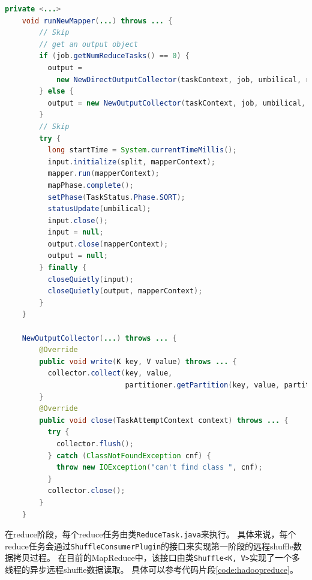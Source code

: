 \begin{lstlisting}[language={Java}, caption={Hadoop MapReduce中Map阶段的shuffle写代码片段}, label={code:hadoopmap}]
    private <...>
    void runNewMapper(...) throws ... {
        // Skip
        // get an output object
        if (job.getNumReduceTasks() == 0) {
          output = 
            new NewDirectOutputCollector(taskContext, job, umbilical, reporter);
        } else {
          output = new NewOutputCollector(taskContext, job, umbilical, reporter);
        }
        // Skip    
        try {
          long startTime = System.currentTimeMillis();
          input.initialize(split, mapperContext);
          mapper.run(mapperContext);
          mapPhase.complete();
          setPhase(TaskStatus.Phase.SORT);
          statusUpdate(umbilical);
          input.close();
          input = null;
          output.close(mapperContext);
          output = null;
        } finally {
          closeQuietly(input);
          closeQuietly(output, mapperContext);
        }
    }

    NewOutputCollector(...) throws ... {
        @Override
        public void write(K key, V value) throws ... {
          collector.collect(key, value,
                            partitioner.getPartition(key, value, partitions));
        }
        @Override
        public void close(TaskAttemptContext context) throws ... {
          try {
            collector.flush();
          } catch (ClassNotFoundException cnf) {
            throw new IOException("can't find class ", cnf);
          }
          collector.close();
        }
    }
\end{lstlisting}

在reduce阶段，每个reduce任务由类\verb|ReduceTask.java|来执行。
具体来说，每个reduce任务会通过\verb|ShuffleConsumerPlugin|的接口来实现第一阶段的远程shuffle数据拷贝过程。
在目前的MapReduce中，该接口由类\verb|Shuffle<K, V>|实现了一个多线程的异步远程shuffle数据读取。
具体可以参考代码片段\ref{code:hadoopreduce}。

